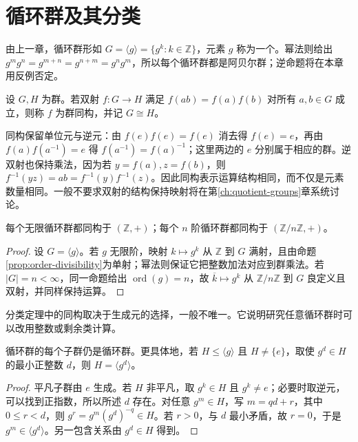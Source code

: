 \documentclass[UTF8,12pt,a4paper,fontset=fandol]{ctexbook}
\begin{document}
\section{循环群及其分类}\label{sec:cyclic-classification}

由上一章，循环群形如 $G=\langle g\rangle=\{g^k:k\in\mathbb Z\}$，元素 $g$ 称为一个。幂法则给出 $g^mg^n=g^{m+n}=g^{n+m}=g^ng^m$，所以每个循环群都是阿贝尔群；逆命题将在本章用反例否定。

\begin{definition}[群同构]\label{def:group-isomorphism}
设 $G,H$ 为群。若双射 $f:G\to H$ 满足 $f(ab)=f(a)f(b)$ 对所有 $a,b\in G$ 成立，则称 $f$ 为群同构，并记 $G\cong H$。
\end{definition}

同构保留单位元与逆元：由 $f(e)f(e)=f(e)$ 消去得 $f(e)=e$，再由 $f(a)f(a^{-1})=e$ 得 $f(a^{-1})=f(a)^{-1}$；这里两边的 $e$ 分别属于相应的群。逆双射也保持乘法，因为若 $y=f(a),z=f(b)$，则 $f^{-1}(yz)=ab=f^{-1}(y)f^{-1}(z)$。因此同构表示运算结构相同，而不仅是元素数量相同。一般不要求双射的结构保持映射将在第\ref{ch:quotient-groups}章系统讨论。

\begin{theorem}[循环群的分类]\label{thm:cyclic-classification}
每个无限循环群都同构于 $(\mathbb Z,+)$；每个 $n$ 阶循环群都同构于 $(\mathbb Z/n\mathbb Z,+)$。
\end{theorem}
\begin{proof}
设 $G=\langle g\rangle$。若 $g$ 无限阶，映射 $k\mapsto g^k$ 从 $\mathbb Z$ 到 $G$ 满射，且由命题\ref{prop:order-divisibility}为单射；幂法则保证它把整数加法对应到群乘法。若 $|G|=n<\infty$，同一命题给出 $\operatorname{ord}(g)=n$，故 $\overline k\mapsto g^k$ 从 $\mathbb Z/n\mathbb Z$ 到 $G$ 良定义且双射，并同样保持运算。
\end{proof}

分类定理中的同构取决于生成元的选择，一般不唯一。它说明研究任意循环群时可以改用整数或剩余类计算。

\begin{theorem}[循环群的子群]\label{thm:cyclic-subgroups}
循环群的每个子群仍是循环群。更具体地，若 $H\leq\langle g\rangle$ 且 $H\ne\{e\}$，取使 $g^d\in H$ 的最小正整数 $d$，则 $H=\langle g^d\rangle$。
\end{theorem}
\begin{proof}
平凡子群由 $e$ 生成。若 $H$ 非平凡，取 $g^k\in H$ 且 $g^k\ne e$；必要时取逆元，可以找到正指数，所以所述 $d$ 存在。对任意 $g^m\in H$，写 $m=qd+r$，其中 $0\leq r<d$，则 $g^r=g^m(g^d)^{-q}\in H$。若 $r>0$，与 $d$ 最小矛盾，故 $r=0$，于是 $g^m\in\langle g^d\rangle$。另一包含关系由 $g^d\in H$ 得到。
\end{proof}
\end{document}
